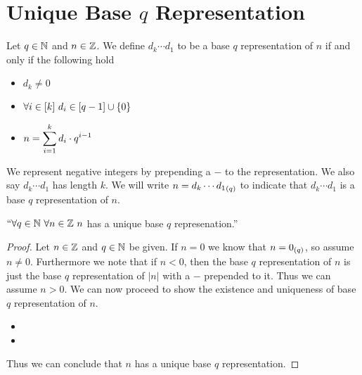     \section{Unique Base $q$ Representation}
        \begin{definition}
            Let $q \in \mathbb{N}$ and $n \in \mathbb{Z}$. We define $d_k\cdots d_1$ to be a base
            $q$ representation of $n$ if and only if the following hold
            \begin{itemize}
                \item
                    $d_k \neq 0$
                \item
                    $\forall i \in [k] \ d_i \in [q - 1] \cup \left\{0\right\}$
                \item
                    $n = \displaystyle\sum_{i = 1}^k d_i \cdot q^{i - 1}$
            \end{itemize}
            We represent negative integers by prepending a $-$ to the representation. We also
            say $d_k\cdots d_1$ has length $k$. We will write $n = {d_k \cdots d_1}_{(q)}$ to indicate that
            $d_k \cdots d_1$ is a base $q$ representation of $n$.
        \end{definition}
        \begin{theorem}
            $``\forall q \in \mathbb{N} \ \forall n \in \mathbb{Z} \ n$ has a unique base $q$ represenation.''
        \end{theorem}
        \begin{proof}
            Let $n \in \mathbb{Z}$ and $q \in \mathbb{N}$ be given. If $n = 0$ we know that
            $n = {0}_{(q)}$, so assume $n \neq 0$. Furthermore we note that if $n < 0$,
            then the base $q$ representation of $n$ is just the base $q$ representation of $|n|$
            with a $-$ prepended to it. Thus we can assume $n > 0$. We can now proceed to show
            the existence and uniqueness of base $q$ representation of $n$.
            \begin{itemize}
                \item
                \item
            \end{itemize}
            Thus we can conclude that $n$ has a unique base $q$ representation. \QED
        \end{proof}
